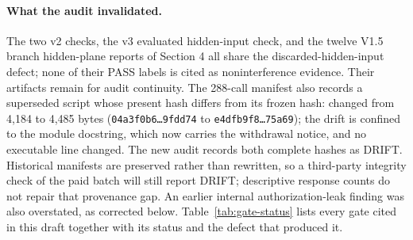 \documentclass[11pt]{article}
\begin{document}
\paragraph{What the audit invalidated.}
The two v2 checks, the v3 evaluated hidden-input check, and the twelve V1.5 branch hidden-plane reports of Section 4 all share the discarded-hidden-input defect; none of their PASS labels is cited as noninterference evidence. Their artifacts remain for audit continuity. The 288-call manifest also records a superseded script whose present hash differs from its frozen hash:  changed from 4,184 to 4,485 bytes (\texttt{04a3f0b6\ldots9fdd74} to \texttt{e4dfb9f8\ldots75a69}); the drift is confined to the module docstring, which now carries the withdrawal notice, and no executable line changed. The new audit records both complete hashes as DRIFT. Historical manifests are preserved rather than rewritten, so a third-party integrity check of the paid batch will still report DRIFT; descriptive response counts do not repair that provenance gap. An earlier internal authorization-leak finding was also overstated, as corrected below. Table~\ref{tab:gate-status} lists every gate cited in this draft together with its status and the defect that produced it.
\end{document}
